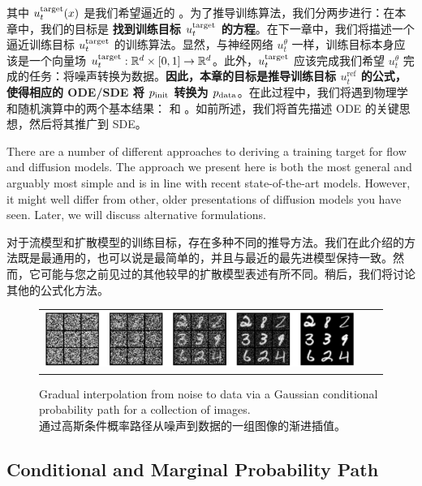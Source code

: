 其中 $u^{\text{target}}_t(x)$ 是我们希望逼近的 。为了推导训练算法，我们分两步进行：在本章中，我们的目标是 \textbf{找到训练目标 $u^{\text{target}}_t$ 的方程}。在下一章中，我们将描述一个逼近训练目标 $u^{\text{target}}_t$ 的训练算法。显然，与神经网络 $u_t^\theta$ 一样，训练目标本身应该是一个向量场 $u^{\text{target}}_t:\mathbb{R}^d\times[0,1]\to\mathbb{R}^d$。此外，$u^{\text{target}}_t$ 应该完成我们希望 $u_t^\theta$ 完成的任务：将噪声转换为数据。\textbf{因此，本章的目标是推导训练目标 $u_t^\text{ref}$ 的公式，使得相应的 ODE/SDE 将 $p_{\rm{init}}$ 转换为 $p_{\rm{data}}$}。在此过程中，我们将遇到物理学和随机演算中的两个基本结果： 和 。如前所述，我们将首先描述 ODE 的关键思想，然后将其推广到 SDE。

\begin{remarkbox}
There are a number of different approaches to deriving a training target for flow and diffusion models. The approach we present here is both the most general and arguably most simple and is in line with recent state-of-the-art models. However, it might well differ from other, older presentations of diffusion models you have seen. Later, we will discuss  alternative formulations.

对于流模型和扩散模型的训练目标，存在多种不同的推导方法。我们在此介绍的方法既是最通用的，也可以说是最简单的，并且与最近的最先进模型保持一致。然而，它可能与您之前见过的其他较早的扩散模型表述有所不同。稍后，我们将讨论其他的公式化方法。
\end{remarkbox}

\begin{figure}[h!]
    \centering
    \begin{tabular}{ccc}
         \includegraphics[width=\textwidth]{figures/noised_mnist_reversed.png} &
    \end{tabular}
    \caption{\label{fig:noising_image} Gradual interpolation from noise to data via  a Gaussian conditional probability path for a collection of images.\\通过高斯条件概率路径从噪声到数据的一组图像的渐进插值。}
\end{figure}

\subsection{Conditional and Marginal Probability Path}

